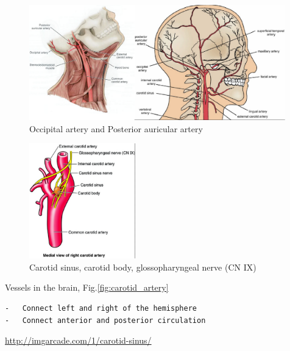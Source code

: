  \begin{figure}[hbt]
  \centerline{\includegraphics[height=5cm,
    angle=0]{./images/occipital_artery.eps}}
\caption{Occipital artery and Posterior auricular artery}
\label{fig:occipital_artery}
\end{figure}

 \begin{figure}[hbt]
  \centerline{\includegraphics[height=5cm,
    angle=0]{./images/carotid_sinus.eps}}
\caption{Carotid sinus, carotid body, glossopharyngeal nerve (CN IX)}
\label{fig:carotid_sinus}
\end{figure}

Vessels in the brain, Fig.\ref{fig:carotid_artery}
\begin{verbatim}
-	Connect left and right of the hemisphere
-	Connect anterior and posterior circulation
\end{verbatim}
\url{http://imgarcade.com/1/carotid-sinus/}


